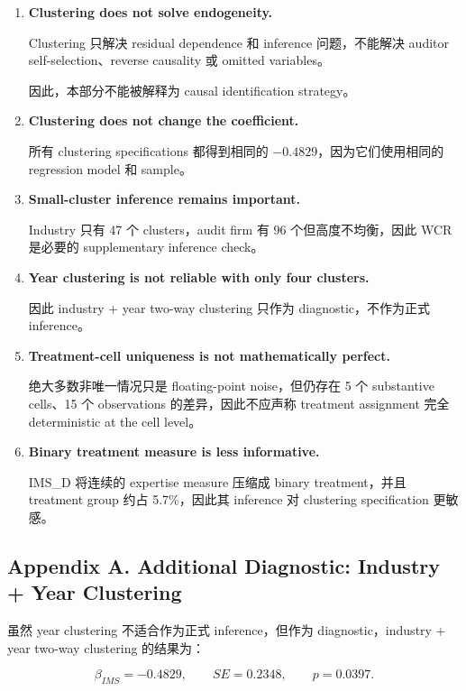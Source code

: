 \documentclass[11pt]{article}
\begin{document}
\begin{enumerate}
    \item \textbf{Clustering does not solve endogeneity.}

    Clustering 只解决 residual dependence 和 inference 问题，不能解决 auditor self-selection、reverse causality 或 omitted variables。

    因此，本部分不能被解释为 causal identification strategy。

    \item \textbf{Clustering does not change the coefficient.}

    所有 clustering specifications 都得到相同的 $-0.4829$，因为它们使用相同的 regression model 和 sample。

    \item \textbf{Small-cluster inference remains important.}

    Industry 只有 47 个 clusters，audit firm 有 96 个但高度不均衡，因此 WCR 是必要的 supplementary inference check。

    \item \textbf{Year clustering is not reliable with only four clusters.}

    因此 industry + year two-way clustering 只作为 diagnostic，不作为正式 inference。

    \item \textbf{Treatment-cell uniqueness is not mathematically perfect.}

    绝大多数非唯一情况只是 floating-point noise，但仍存在 5 个 substantive cells、15 个 observations 的差异，因此不应声称 treatment assignment 完全 deterministic at the cell level。

    \item \textbf{Binary treatment measure is less informative.}

    IMS\_D 将连续的 expertise measure 压缩成 binary treatment，并且 treatment group 约占 5.7\%，因此其 inference 对 clustering specification 更敏感。
\end{enumerate}

\subsection{Appendix A. Additional Diagnostic: Industry + Year Clustering}

虽然 year clustering 不适合作为正式 inference，但作为 diagnostic，industry + year two-way clustering 的结果为：

\[
\beta_{IMS}=-0.4829,\qquad SE=0.2348,\qquad p=0.0397.
\]
\end{document}
